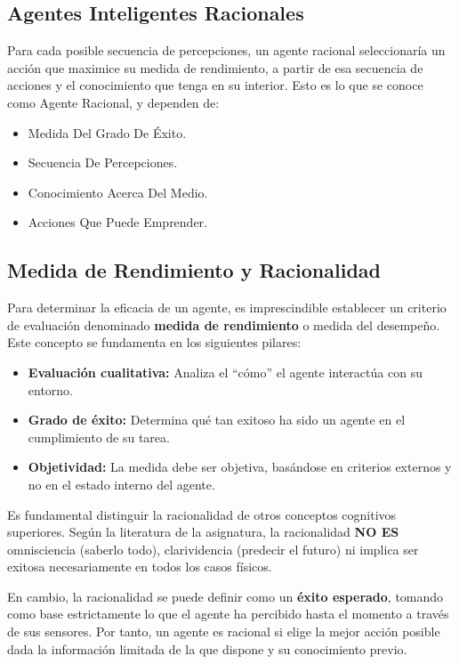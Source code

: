 \subsection{Agentes Inteligentes Racionales}
Para cada posible secuencia de percepciones, un agente racional seleccionaría un acción que
maximice su medida de rendimiento, a partir de esa secuencia de acciones y el conocimiento 
que tenga en su interior. Esto es lo que se conoce como Agente Racional, y dependen de:

\begin{itemize}
    \item Medida Del Grado De Éxito.
    \item Secuencia De Percepciones.
    \item Conocimiento Acerca Del Medio.
    \item Acciones Que Puede Emprender.
\end{itemize}

\subsection{Medida de Rendimiento y Racionalidad}

Para determinar la eficacia de un agente, es imprescindible establecer un criterio de evaluación denominado \textbf{medida de rendimiento} o medida del desempeño. Este concepto se fundamenta en los siguientes pilares:

\begin{itemize}
    \item \textbf{Evaluación cualitativa:} Analiza el ``cómo'' el agente interactúa con su entorno.
    \item \textbf{Grado de éxito:} Determina qué tan exitoso ha sido un agente en el cumplimiento de su tarea.
    \item \textbf{Objetividad:} La medida debe ser objetiva, basándose en criterios externos y no en el estado interno del agente.
\end{itemize}

\bigskip

Es fundamental distinguir la racionalidad de otros conceptos cognitivos superiores. 
Según la literatura de la asignatura, la racionalidad \textbf{NO ES} omnisciencia 
(saberlo todo), clarividencia (predecir el futuro) ni implica ser exitosa necesariamente 
en todos los casos físicos.

\bigskip

En cambio, la racionalidad se puede definir como un \textbf{éxito esperado}, tomando como 
base estrictamente lo que el agente ha percibido hasta el momento a través de sus sensores. 
Por tanto, un agente es racional si elige la mejor acción posible dada la información 
limitada de la que dispone y su conocimiento previo.


